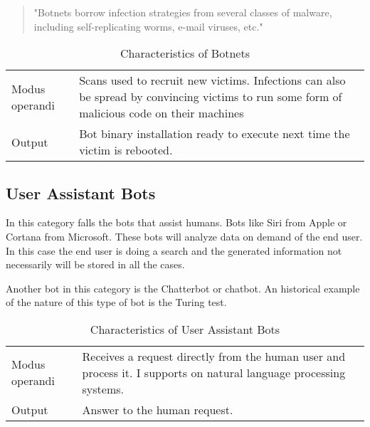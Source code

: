\documentclass[twoside]{article}
\begin{document}
\begin{multicols}{2}
    \begin{quote}
        "Botnets borrow infection strategies from several classes of malware, including self-replicating worms, e-mail viruses, etc."
    \end{quote}
    
    \begin{table}[H]
        \caption{Characteristics of Botnets}
        \begin{tabular}{p{2cm} p{4cm}}
        \toprule
        Modus operandi &  Scans used to recruit new victims. Infections can also be spread by convincing victims to run some form
            of malicious code on their machines\\ 
        Output                &  Bot binary installation ready to execute next time the victim is rebooted. \\
        \bottomrule
        \end{tabular}
        \label{tab:botnetb}
    \end{table}
    
\subsection{User Assistant Bots}
    In this category falls the bots that assist humans. Bots like Siri from Apple or Cortana from Microsoft. These bots will analyze data on demand of the
    end user. In this case the end user is doing a search and the generated information not necessarily will be stored in all the cases.
    
    Another bot in this category is the Chatterbot or chatbot. An historical example of the nature of this type of bot is the Turing test.
    
    \begin{table}[H]
        \caption{Characteristics of User Assistant Bots}
        \begin{tabular}{p{2cm} p{4cm}}
        \toprule
        Modus operandi &  Receives a request directly from the human user and process it. I supports on natural language processing systems.  \\ 
        Output                &  Answer to the human request. \\
        \bottomrule
        \end{tabular}
        \label{tab:botnetb}
    \end{table}
    







\end{multicols}
\end{document}
